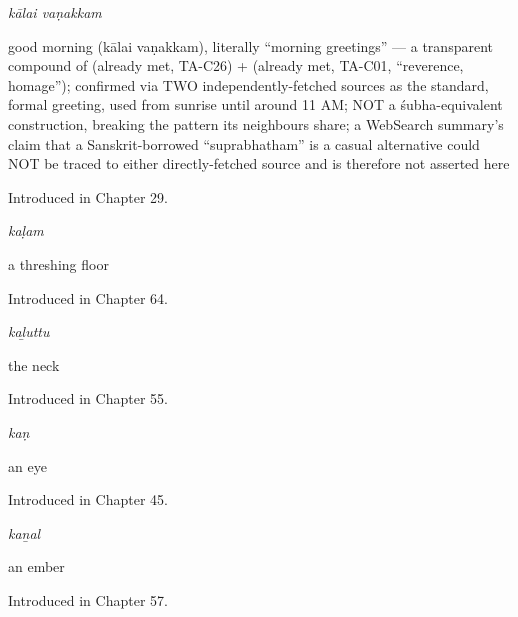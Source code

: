 \noindent\begin{minipage}[t]{\linewidth}
\raggedright
\textbf{ }\enspace\emph{kālai vaṇakkam}\par
\small good morning (kālai vaṇakkam), literally \textquotedblleft{}morning greetings\textquotedblright{} — a transparent compound of  (already met, TA-C26) +  (already met, TA-C01, \textquotedblleft{}reverence, homage\textquotedblright{}); confirmed via TWO independently-fetched sources as the standard, formal greeting, used from sunrise until around 11 AM; NOT a śubha-equivalent construction, breaking the pattern its neighbours share; a WebSearch summary's claim that a Sanskrit-borrowed \textquotedblleft{}suprabhatham\textquotedblright{} is a casual alternative could NOT be traced to either directly-fetched source and is therefore not asserted here\par
\footnotesize Introduced in Chapter 29.
\end{minipage}\par\medskip

\noindent\begin{minipage}[t]{\linewidth}
\raggedright
\textbf{}\enspace\emph{kaḷam}\par
\small a threshing floor\par
\footnotesize Introduced in Chapter 64.
\end{minipage}\par\medskip

\noindent\begin{minipage}[t]{\linewidth}
\raggedright
\textbf{}\enspace\emph{kaḻuttu}\par
\small the neck\par
\footnotesize Introduced in Chapter 55.
\end{minipage}\par\medskip

\noindent\begin{minipage}[t]{\linewidth}
\raggedright
\textbf{}\enspace\emph{kaṇ}\par
\small an eye\par
\footnotesize Introduced in Chapter 45.
\end{minipage}\par\medskip

\noindent\begin{minipage}[t]{\linewidth}
\raggedright
\textbf{}\enspace\emph{kaṉal}\par
\small an ember\par
\footnotesize Introduced in Chapter 57.
\end{minipage}\par\medskip

